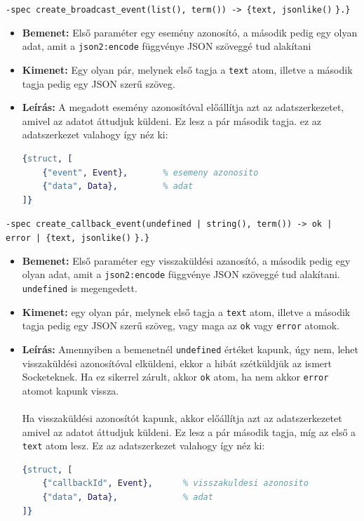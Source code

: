 \noindent \lstinline{-spec create_broadcast_event(list(), term()) -> {text, jsonlike()} \lstinline|}.}|
\begin{itemize}
    \item \textbf{Bemenet:} Első paraméter egy esemény azonosító, a második pedig egy olyan adat, amit a \lstinline{json2:encode} függvénye JSON szöveggé tud alakítani
    \item \textbf{Kimenet:} Egy olyan pár, melynek első tagja a \lstinline{text} atom, illetve a második tagja pedig egy JSON szerű szöveg. 
    \item \textbf{Leírás:} A megadott esemény azonosítóval előállítja azt az adatszerkezetet, amivel az adatot áttudjuk küldeni. Ez lesz a pár második tagja. ez az adatszerkezet valahogy így néz ki:
\lstset{caption=Esemény alapú küldés szerkezete, label=structQueryRes2}
\begin{lstlisting}[language={erlang}]
{struct, [
    {"event", Event},       % esemeny azonosito
    {"data", Data},         % adat
]}
\end{lstlisting}
\end{itemize} 

\noindent \lstinline{-spec create_callback_event(undefined | string(), term()) -> ok | error | {text, jsonlike()} \lstinline|}.}|
\begin{itemize}
    \item \textbf{Bemenet:} Első paraméter egy visszaküldési azanosító, a második pedig egy olyan adat, amit a \lstinline{json2:encode} függvénye JSON szöveggé tud alakítani. \lstinline{undefined} is megengedett.
    \item \textbf{Kimenet:} egy olyan pár, melynek első tagja a \lstinline{text} atom, illetve a második tagja pedig egy JSON szerű szöveg, vagy maga az \lstinline{ok} vagy \lstinline{error} atomok.
    \item \textbf{Leírás:} Amennyiben a bemenetnél \lstinline{undefined} értéket kapunk, úgy nem, lehet visszaküldési azonosítóval elküldeni, ekkor a hibát szétküldjük az ismert Socketeknek. Ha ez sikerrel zárult, akkor \lstinline{ok} atom, ha nem akkor \lstinline{error} atomot kapunk vissza. \\ \\ Ha visszaküldési azonosítót kapunk, akkor előállítja azt az adatszerkezetet amivel az adatot áttudjuk küldeni. Ez lesz a pár második tagja, míg az első a \lstinline{text} atom lesz. Ez az adatszerkezet valahogy így néz ki:

\lstset{caption=Visszaküldési azonosítós küldés szerkezete, label=structQueryRes3}
\begin{lstlisting}[language={erlang}]
{struct, [
    {"callbackId", Event},      % visszakuldesi azonosito
    {"data", Data},             % adat
]}
\end{lstlisting}
\end{itemize} 

